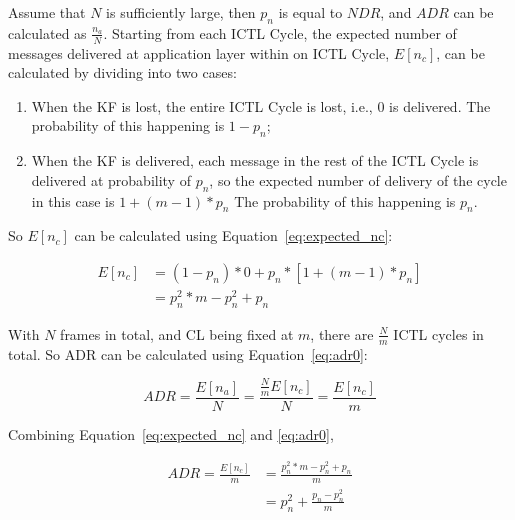 \documentclass[12pt]{report}
\begin{document}
Assume that $N$ is sufficiently large, then $p_n$ is equal to $NDR$, and $ADR$ can be calculated as $\frac{n_a}{N}$. Starting from each ICTL Cycle, the expected number of messages delivered at application layer within on ICTL Cycle, $E[n_c]$, can be calculated by dividing into two cases:
\begin{enumerate}
  \item When the KF is lost, the entire ICTL Cycle is lost, i.e., 0 is delivered. The probability of this happening is $1-p_n$;
  \item When the KF is delivered, each message in the rest of the ICTL Cycle is delivered at probability of $p_n$, so the expected number of delivery of the cycle in this case is $1+(m-1)*p_n$ The probability of this happening is $p_n$.
\end{enumerate}

So $E[n_c]$ can be calculated using Equation~\ref{eq:expected_nc}:

\begin{equation}
  \begin{split}
    E[n_c] & = (1-p_n) * 0 + p_n * [1 + (m - 1) * p_n] \\
           & = p_n^2 * m - p_n^2 + p_n
  \end{split}
  \label{eq:expected_nc}
\end{equation}

With $N$ frames in total, and CL being fixed at $m$, there are $\frac{N}{m}$ ICTL cycles in total. So ADR can be calculated using Equation~\ref{eq:adr0}:

\begin{equation}
  ADR = \frac{E[n_a]}{N} = \frac{\frac{N}{m}E[n_c]}{N} = \frac{E[n_c]}{m}
  \label{eq:adr0}
\end{equation}

Combining Equation~\ref{eq:expected_nc} and \ref{eq:adr0},

\begin{equation}
  \begin{split}
    ADR = \frac{E[n_c]}{m} & = \frac{p_n^2*m-p_n^2+p_n}{m} \\
                           & = p_n^2 + \frac{p_n-p_n^2}{m}
  \end{split}
  \label{eq:adr}
\end{equation}
\end{document}
